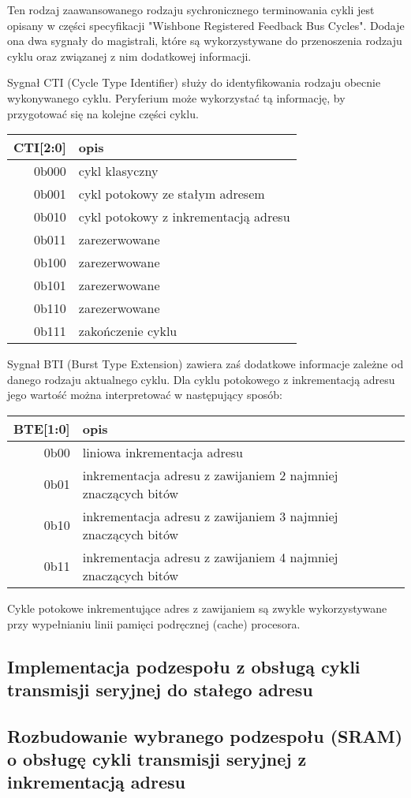 Ten rodzaj zaawansowanego rodzaju sychronicznego terminowania cykli jest opisany w części specyfikacji "Wishbone Registered Feedback Bus Cycles". Dodaje ona dwa sygnały do magistrali, które są wykorzystywane do przenoszenia rodzaju cyklu oraz związanej z nim dodatkowej informacji.

Sygnał CTI (Cycle Type Identifier) służy do identyfikowania rodzaju obecnie wykonywanego cyklu. Peryferium może wykorzystać tą informację, by przygotować się na kolejne części cyklu.
\begin{center}
\begin{tabular}{ r|l }
 CTI[2:0] & opis \\ 
 \hline
 0b000 & cykl klasyczny \\
 0b001 & cykl potokowy ze stałym adresem \\
 0b010 & cykl potokowy z inkrementacją adresu \\
 0b011 & zarezerwowane \\
 0b100 & zarezerwowane \\
 0b101 & zarezerwowane \\
 0b110 & zarezerwowane \\
 0b111 & zakończenie cyklu \\
 \hline
\end{tabular}
\end{center}

Sygnał BTI (Burst Type Extension) zawiera zaś dodatkowe informacje zależne od danego rodzaju aktualnego cyklu.
Dla cyklu potokowego z inkrementacją adresu jego wartość można interpretować w następujący sposób:

\begin{center}
\begin{tabular}{ r|l }
 BTE[1:0] & opis \\ 
 \hline
 0b00 & liniowa inkrementacja adresu \\
 0b01 & inkrementacja adresu z zawijaniem 2 najmniej znaczących bitów \\
 0b10 & inkrementacja adresu z zawijaniem 3 najmniej znaczących bitów \\
 0b11 & inkrementacja adresu z zawijaniem 4 najmniej znaczących bitów \\
 \hline
\end{tabular}
\end{center}



Cykle potokowe inkrementujące adres z zawijaniem są zwykle wykorzystywane przy wypełnianiu linii pamięci podręcznej (cache) procesora.

\subsection{Implementacja podzespołu z obsługą cykli transmisji seryjnej do stałego adresu}

\subsection{Rozbudowanie wybranego podzespołu (SRAM) o obsługę cykli transmisji seryjnej z inkrementacją adresu}
